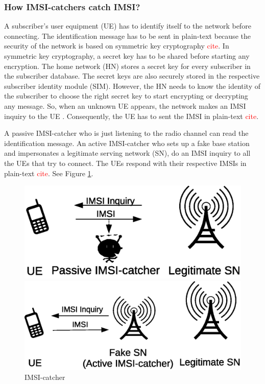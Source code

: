 \documentclass{llncs} %
\begin{document}
\subsubsection{How IMSI-catchers catch IMSI?} A subscriber's user equipment (UE) has to identify itself to the network before connecting. The identification message has to be sent in plain-text because the security of the network is based on symmetric key cryptography \textcolor{red}{cite}. In symmetric key cryptography, a secret key has to be shared before starting any encryption. The home network (HN) stores a secret key for every subscriber in the subscriber database. The secret keys are also securely stored in the respective subscriber identity module (SIM). However, the HN needs to know the identity of the subscriber to choose the right secret key to start encrypting or decrypting any message. So, when an unknown UE appears, the network makes an IMSI inquiry to the UE . Consequently, the UE has to sent the IMSI in plain-text \textcolor{red}{cite}. 

A passive IMSI-catcher who is just listening to the radio channel can read the identification message. An active IMSI-catcher who sets up a fake base station and impersonates a legitimate serving network (SN), do an IMSI inquiry to all the UEs that try to connect. The UEs respond with their respective IMSIs in plain-text \textcolor{red}{cite}. See Figure \ref{fig:IMSI-catching}. 

\begin{figure}[!tbp]
  \centering
  \begin{minipage}[b]{0.44\textwidth}
    \includegraphics[width=\textwidth]{Passive_IMSI-Catcher.eps}
  \end{minipage}
  \hfill
  \begin{minipage}[b]{0.50\textwidth}
    \includegraphics[width=\textwidth]{Active-IMSI-Cactcher.eps}
  \end{minipage}
  \caption{IMSI-catcher}
  \label{fig:IMSI-catching}
\end{figure}
\end{document}
